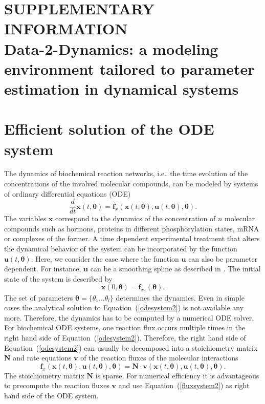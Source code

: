 \documentclass[12pt,a4paper]{scrartcl}
\newcommand{\DD}[2]{\frac{d #1}{d #2}}
\begin{document}
\section*{SUPPLEMENTARY INFORMATION\\Data-2-Dynamics: a modeling environment tailored to parameter estimation in dynamical systems}

\renewcommand*\contentsname{Contents}
\tableofcontents

\section{Efficient solution of the ODE system} \label{sec:ode_solvers}
The dynamics of biochemical reaction networks, i.e.~the time evolution of the concentra\-tions of the involved molecular compounds, can be modeled by systems of ordinary differential equations (ODE)
\begin{equation}
	\DD{}{t}{\mathbf{x}}(t, \boldsymbol{\theta}) = \mathbf{f}_{x}(\mathbf{x}(t, \boldsymbol{\theta}), \mathbf{u}(t, \boldsymbol{\theta}), \boldsymbol{\theta}). \label{odesystem2}
\end{equation}
The variables $\mathbf{x}$ correspond to the dynamics of the concentration of $n$ molecular compounds such as hormons, proteins in different phosphorylation states, mRNA or complexes of the former. A time dependent experimental treatment that alters the dynamical behavior of the system can be incorporated by the function $\mathbf{u}(t, \boldsymbol{\theta})$. Here, we consider the case where the function $\mathbf{u}$ can also be parameter dependent. For instance, $\mathbf{u}$ can be a smoothing spline as described in \citet{Schelker:2012uq}. The initial state of the system is described by 
\begin{equation}
	\mathbf{x}(0, \boldsymbol{\theta}) = \mathbf{f}_{x_0}(\boldsymbol{\theta}). \label{init_ode_sys}
\end{equation}	
The set of parameters $\boldsymbol{\theta} = \{\theta_1 \dots \theta_l\}$ determines the  dynamics. Even in simple cases the analytical solution to Equation~(\ref{odesystem2}) is not available any more. Therefore, the dynamics has to be computed by a numerical ODE solver. For biochemical ODE systems, one reaction flux occurs multiple times in the right hand side of Equation~(\ref{odesystem2}). Therefore, the right hand side of Equation~(\ref{odesystem2}) can usually be decomposed into a stoichiometry matrix $\mathbf{N}$ and rate equations $\mathbf{v}$ of the reaction fluxes of the molecular interactions
\begin{equation}
	\mathbf{f}_{x}(\mathbf{x}(t, \boldsymbol{\theta}), \mathbf{u}(t, \boldsymbol{\theta}), \boldsymbol{\theta}) = \mathbf{N} \cdot \mathbf{v}(\mathbf{x}(t, \boldsymbol{\theta}), \mathbf{u}(t, \boldsymbol{\theta}), \boldsymbol{\theta}). \label{fluxsystem2}
\end{equation}
The stoichiometry matrix $\mathbf{N}$ is sparse. For numerical efficiency it is advantageous to precompute the reaction fluxes $\mathbf{v}$ and use Equation~(\ref{fluxsystem2}) as right hand side of the ODE system. 
\end{document}
